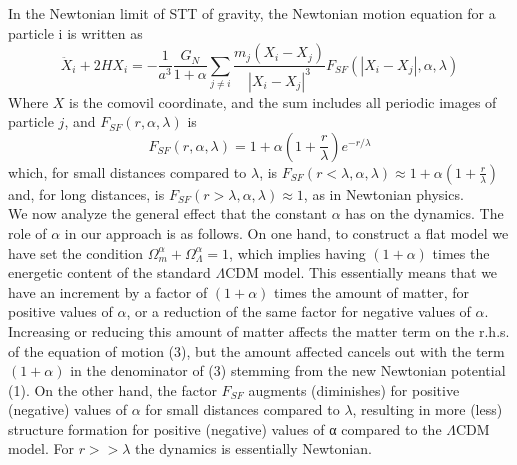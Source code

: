\documentclass[10pt,times]{IEEEtran}
\begin{document}
In the Newtonian limit of STT of gravity, the Newtonian motion equation for a particle i is written as
\begin{equation}
    \ddot{X}_{i}+2HX_{i}=-\frac{1}{a^{3}} \frac{G_{N}}{1+\alpha}\sum_{j\neq i} \frac{m_{j}(X_{i}-X_{j})}{\left | X_{i}-X_{j} \right |^{3}} F_{SF}(\left | X_{i}-X_{j} \right |,\alpha,\lambda)
\end{equation}
Where $X$ is the comovil coordinate, and the sum includes all periodic images of particle $j$, and \(F_{SF}(r,\alpha,\lambda)\) is
\begin{equation}
    F_{SF}(r,\alpha,\lambda)=1+\alpha \left ( 1+\frac{r}{\lambda} \right )e^{-r/\lambda}
\end{equation}
which, for small distances compared to \(\lambda\), is \(F_{SF}(r<\lambda,\alpha,\lambda)\approx 1+\alpha(1+\frac{r}{\lambda})\) and, for long distances, is \(F_{SF}(r>\lambda,\alpha,\lambda)\approx 1\), as in Newtonian physics.\\

We now analyze the general effect that the constant
\(\alpha\) has on the dynamics. The role of \(\alpha\) in our approach
is as follows. On one hand, to construct a flat model
we have set the condition \(\Omega_{m}^{\alpha}+\Omega_{\Lambda}^{\alpha}=1\), which implies having \((1+\alpha)\)  times the energetic content of the standard \(\Lambda\)CDM model. This essentially means that we have an increment by a factor of \((1+\alpha)\) times the amount of matter, for positive values of \(\alpha\), or a reduction of the
same factor for negative values of \(\alpha\). Increasing or reducing this amount of matter affects the matter term on the r.h.s. of the equation of motion (3), but the amount affected cancels out with the term \((1+\alpha)\)  in the denominator of (3) stemming from the new Newtonian potential (1). On the other hand, the factor $F_{SF}$ augments (diminishes) for positive (negative) values of \(\alpha\) for small distances compared to \(\lambda\), resulting in more (less) structure
formation for positive (negative) values of α compared to
the \(\Lambda\)CDM model. For \(r>>\lambda\) the dynamics is essentially
Newtonian.
\end{document}
